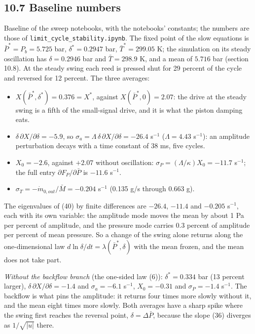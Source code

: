 \documentclass[11pt]{article}
\begin{document}
\subsection*{10.7 Baseline numbers}

Baseline of the sweep notebooks, with the notebooks' constants; the numbers are those of \texttt{limit\_\allowbreak cycle\_\allowbreak stability.ipynb}. The fixed point of the slow equations is $\bar P^* = P_b = 5.725$ bar, $\delta^* = 0.2947$ bar, $\bar T^* = 299.05$ K; the simulation on its steady oscillation has $\delta = 0.2946$ bar and $\bar T = 298.9$ K, and a mean of $5.716$ bar (section 10.8). At the steady swing each reed is pressed shut for 29 percent of the cycle and reversed for 12 percent. The three averages:
\begin{itemize}
\item $X(\bar P^*, \delta^*) = 0.376 = X^*$, against $X(\bar P^*, 0) = 2.07$: the drive at the steady swing is a fifth of the small-signal drive, and it is what the piston damping eats.
\item $\delta\,\partial X/\partial\delta = -5.9$, so $\sigma_a = \Lambda\,\delta\,\partial X/\partial\delta = -26.4$ s$^{-1}$ ($\Lambda = 4.43$ s$^{-1}$): an amplitude perturbation decays with a time constant of 38 ms, five cycles.
\item $X_0 = -2.6$, against $+2.07$ without oscillation: $\sigma_P = (\Lambda/\kappa)X_0 = -11.7$ s$^{-1}$; the full entry $\partial F_P/\partial\bar P$ is $-11.6$ s$^{-1}$.
\item $\sigma_T = -\dot m_{0,out}/\bar M = -0.204$ s$^{-1}$ (0.135 g/s through 0.663 g).
\end{itemize}
The eigenvalues of (40) by finite differences are $-26.4$, $-11.4$ and $-0.205$ s$^{-1}$, each with its own variable: the amplitude mode moves the mean by about 1 Pa per percent of amplitude, and the pressure mode carries 0.3 percent of amplitude per percent of mean pressure. So a change of the swing alone returns along the one-dimensional law $d\ln\delta/dt = \lambda(\bar P^*, \delta)$ with the mean frozen, and the mean does not take part.

\emph{Without the backflow branch} (the one-sided law (6)): $\delta^* = 0.334$ bar (13 percent larger), $\delta\,\partial X/\partial\delta = -1.4$ and $\sigma_a = -6.1$ s$^{-1}$, $X_0 = -0.31$ and $\sigma_P = -1.4$ s$^{-1}$. The backflow is what pins the amplitude: it returns four times more slowly without it, and the mean eight times more slowly. Both averages have a sharp spike where the swing first reaches the reversal point, $\delta = \Delta\bar P$, because the slope (36) diverges as $1/\sqrt{\lvert u\rvert}$ there.
\end{document}
